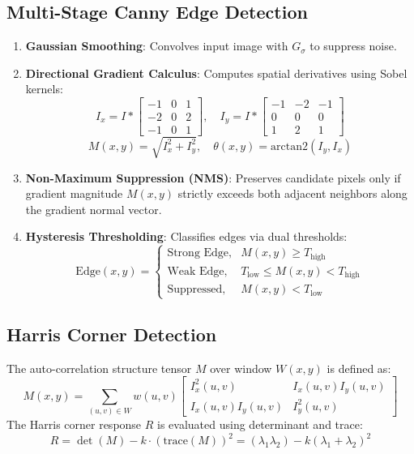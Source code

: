 \documentclass[12pt,a4paper]{article}
\begin{document}
\subsection{Multi-Stage Canny Edge Detection}
\begin{enumerate}
    \item \textbf{Gaussian Smoothing}: Convolves input image with $G_\sigma$ to suppress noise.
    \item \textbf{Directional Gradient Calculus}: Computes spatial derivatives using Sobel kernels:
    \begin{equation}
    I_x = I * \begin{bmatrix} -1 & 0 & 1 \\ -2 & 0 & 2 \\ -1 & 0 & 1 \end{bmatrix}, \quad I_y = I * \begin{bmatrix} -1 & -2 & -1 \\ 0 & 0 & 0 \\ 1 & 2 & 1 \end{bmatrix}
    \end{equation}
    \begin{equation}
    M(x, y) = \sqrt{I_x^2 + I_y^2}, \quad \theta(x, y) = \text{arctan2}(I_y, I_x)
    \end{equation}
    \item \textbf{Non-Maximum Suppression (NMS)}: Preserves candidate pixels only if gradient magnitude $M(x, y)$ strictly exceeds both adjacent neighbors along the gradient normal vector.
    \item \textbf{Hysteresis Thresholding}: Classifies edges via dual thresholds:
    \begin{equation}
    \text{Edge}(x, y) = \begin{cases} \text{Strong Edge}, & M(x, y) \ge T_{\text{high}} \\ \text{Weak Edge}, & T_{\text{low}} \le M(x, y) < T_{\text{high}} \\ \text{Suppressed}, & M(x, y) < T_{\text{low}} \end{cases}
    \end{equation}
\end{enumerate}

\subsection{Harris Corner Detection}
The auto-correlation structure tensor $M$ over window $W(x, y)$ is defined as:
\begin{equation}
M(x, y) = \sum_{(u, v) \in W} w(u, v) \begin{bmatrix} I_x^2(u, v) & I_x(u, v)I_y(u, v) \\ I_x(u, v)I_y(u, v) & I_y^2(u, v) \end{bmatrix}
\end{equation}
The Harris corner response $R$ is evaluated using determinant and trace:
\begin{equation}
R = \det(M) - k \cdot (\text{trace}(M))^2 = (\lambda_1 \lambda_2) - k(\lambda_1 + \lambda_2)^2
\end{equation}
\end{document}
